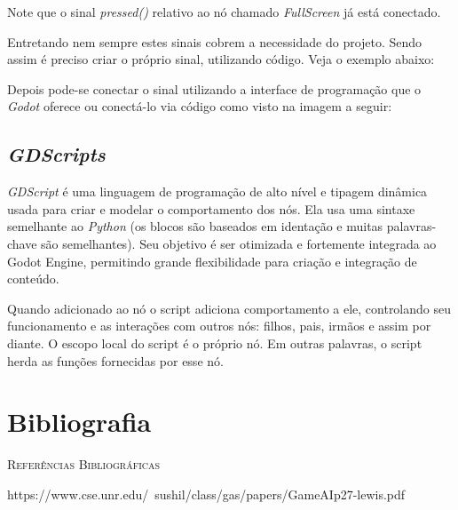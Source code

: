 Note que o sinal \textit{pressed()} relativo ao nó chamado \textit{FullScreen} 
já está conectado.

Entretando nem sempre estes sinais cobrem a necessidade do projeto. Sendo assim
é preciso criar o próprio sinal, utilizando código. Veja o exemplo abaixo:


Depois pode-se conectar o sinal utilizando a interface de programação
que o \textit{Godot} oferece ou conectá-lo via código como visto na imagem
a seguir:



\subsection{\textit{GDScripts}}

\textit{GDScript} é uma linguagem de programação de alto nível e tipagem 
dinâmica usada para criar e modelar o comportamento dos nós.
Ela usa uma sintaxe semelhante ao \textit{Python} (os blocos são 
baseados em identação e muitas palavras-chave são semelhantes). 
Seu objetivo é ser otimizada e fortemente integrada ao Godot Engine, permitindo
grande flexibilidade para criação e integração de conteúdo.

Quando adicionado ao nó o script adiciona comportamento a ele, controlando seu
funcionamento e as interações com outros nós: filhos, pais, irmãos e assim por 
diante. O escopo local do script é o próprio nó. Em outras palavras, o script 
herda as funções fornecidas por esse nó.

\section{Bibliografia}

\textsc{Referências Bibliográficas} 

\textnormal{https://www.cse.unr.edu/~sushil/class/gas/papers/GameAIp27-lewis.pdf}
